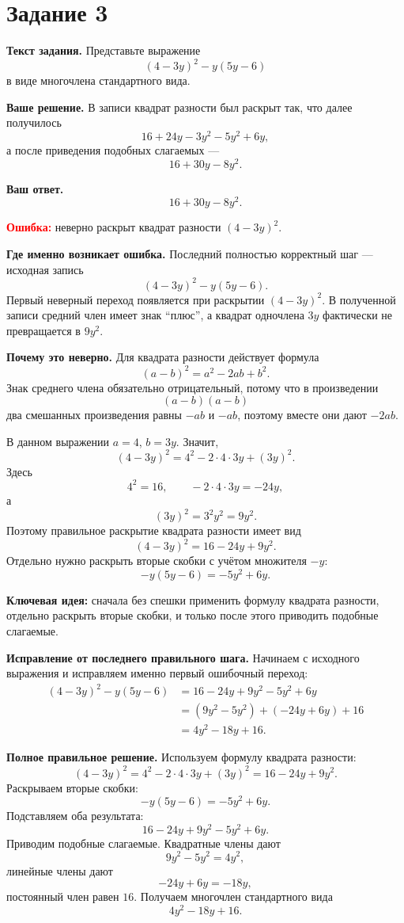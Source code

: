 \documentclass[12pt,a4paper]{article}
\begin{document}
\newpage
{}\label{task:3}
\section*{Задание 3}

\textbf{Текст задания.}
Представьте выражение
\[
(4-3y)^2-y(5y-6)
\]
в виде многочлена стандартного вида.

\textbf{Ваше решение.}
В записи квадрат разности был раскрыт так, что далее получилось
\[
16+24y-3y^2-5y^2+6y,
\]
а после приведения подобных слагаемых ---
\[
16+30y-8y^2.
\]

\textbf{Ваш ответ.}
\[
16+30y-8y^2.
\]

\textcolor{red}{\textbf{Ошибка:}} неверно раскрыт квадрат разности $(4-3y)^2$.

\textbf{Где именно возникает ошибка.}
Последний полностью корректный шаг --- исходная запись
\[
(4-3y)^2-y(5y-6).
\]
Первый неверный переход появляется при раскрытии $(4-3y)^2$. В полученной записи средний член имеет знак ``плюс'', а квадрат одночлена $3y$ фактически не превращается в $9y^2$.

\textbf{Почему это неверно.}
Для квадрата разности действует формула
\[
(a-b)^2=a^2-2ab+b^2.
\]
Знак среднего члена обязательно отрицательный, потому что в произведении
\[
(a-b)(a-b)
\]
два смешанных произведения равны $-ab$ и $-ab$, поэтому вместе они дают $-2ab$.

В данном выражении $a=4$, $b=3y$. Значит,
\[
(4-3y)^2=4^2-2\cdot4\cdot3y+(3y)^2.
\]
Здесь
\[
4^2=16,\qquad -2\cdot4\cdot3y=-24y,
\]
а
\[
(3y)^2=3^2y^2=9y^2.
\]
Поэтому правильное раскрытие квадрата разности имеет вид
\[
(4-3y)^2=16-24y+9y^2.
\]
Отдельно нужно раскрыть вторые скобки с учётом множителя $-y$:
\[
-y(5y-6)=-5y^2+6y.
\]

\textcolor{blue!60!black}{\textbf{Ключевая идея:}}
сначала без спешки применить формулу квадрата разности, отдельно раскрыть вторые скобки, и только после этого приводить подобные слагаемые.

\textbf{Исправление от последнего правильного шага.}
Начинаем с исходного выражения и исправляем именно первый ошибочный переход:
\begin{align*}
(4-3y)^2-y(5y-6)
&=16-24y+9y^2-5y^2+6y\\
&=(9y^2-5y^2)+(-24y+6y)+16\\
&=4y^2-18y+16.
\end{align*}

\textbf{Полное правильное решение.}
Используем формулу квадрата разности:
\[
(4-3y)^2=4^2-2\cdot4\cdot3y+(3y)^2
=16-24y+9y^2.
\]
Раскрываем вторые скобки:
\[
-y(5y-6)=-5y^2+6y.
\]
Подставляем оба результата:
\[
16-24y+9y^2-5y^2+6y.
\]
Приводим подобные слагаемые. Квадратные члены дают
\[
9y^2-5y^2=4y^2,
\]
линейные члены дают
\[
-24y+6y=-18y,
\]
постоянный член равен $16$. Получаем многочлен стандартного вида
\[
\boxed{4y^2-18y+16}.
\]
\end{document}
